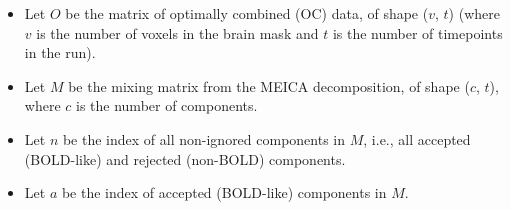 \documentclass[10pt]{article}
\begin{document}
\begin{itemize}[noitemsep, nolistsep]
  \item
  Let $O$ be the matrix of optimally combined (OC) data, of shape ($v$, $t$)
  (where $v$ is the number of voxels in the brain mask and $t$ is the number of
  timepoints in the run).

  \item
  Let $M$ be the mixing matrix from the MEICA decomposition, of shape ($c$, $t$),
  where $c$ is the number of components.

  \item
  Let $n$ be the index of all non-ignored components in $M$, i.e., all accepted
  (BOLD-like) and rejected (non-BOLD) components.

  \item
  Let $a$ be the index of accepted (BOLD-like) components in $M$.
\end{itemize}

\bigskip
\end{document}
